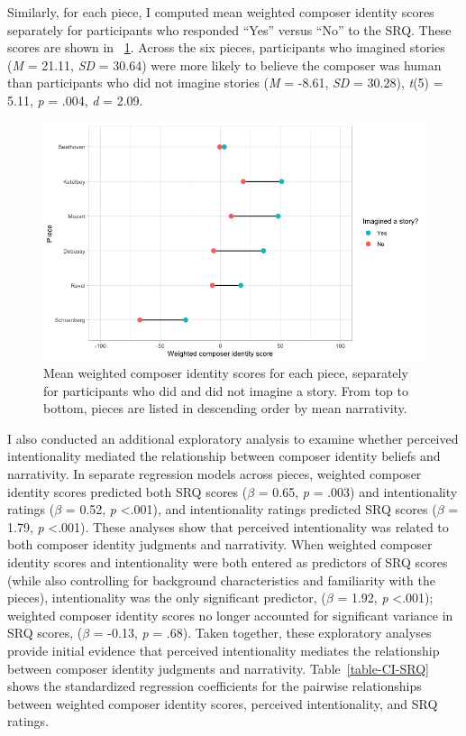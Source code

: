 \documentclass[12pt,twoside]{reedthesis}
\begin{document}
Similarly, for each piece, I computed mean weighted composer identity scores separately for participants who responded “Yes” versus “No” to the SRQ. These scores are shown in ~\ref{fig-ci-differences}. Across the six pieces, participants who imagined stories (\emph{M} = 21.11, \emph{SD} = 30.64) were more likely to believe the composer was human than participants who did not imagine stories (\emph{M} = -8.61, \emph{SD} = 30.28), \emph{t}(5) = 5.11, \emph{p} = .004, \emph{d} = 2.09.

\begin{figure}[h!tbp]
	\centering
	\includegraphics[scale=0.5]{CI_differences.png}
	\caption{Mean weighted composer identity scores for each piece, separately for participants who did and did not imagine a story. From top to bottom, pieces are listed in descending order by mean narrativity.}
	\label{fig-ci-differences}
\end{figure}

I also conducted an additional exploratory analysis to examine whether perceived intentionality mediated the relationship between composer identity beliefs and narrativity. In separate regression models across pieces, weighted composer identity scores predicted both SRQ scores ($\beta$ = 0.65, \emph{p} = .003) and intentionality ratings ($\beta$ = 0.52, \emph{p}  \textless .001), and intentionality ratings predicted SRQ scores ($\beta$ = 1.79, \emph{p} \textless .001). These analyses show that perceived intentionality was related to both composer identity judgments and narrativity. When weighted composer identity scores and intentionality were both entered as predictors of SRQ scores (while also controlling for background characteristics and familiarity with the pieces), intentionality was the only significant predictor, ($\beta$ = 1.92, \emph{p} \textless .001); weighted composer identity scores no longer accounted for significant variance in SRQ scores, ($\beta$ = -0.13, \emph{p} = .68). Taken together, these exploratory analyses provide initial evidence that perceived intentionality mediates the relationship between composer identity judgments and narrativity. Table~\ref*{table-CI-SRQ} shows the standardized regression coefficients for the pairwise relationships between weighted composer identity scores, perceived intentionality, and SRQ ratings.
\end{document}
